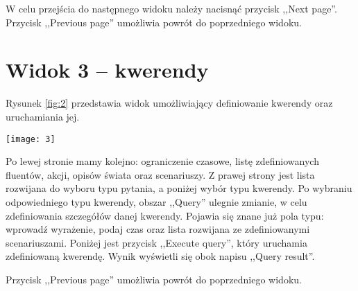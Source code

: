 \documentclass{mini}
\begin{document}
W celu przejścia do następnego widoku należy nacisnąć przycisk ,,Next page''. Przycisk ,,Previous page'' umożliwia powrót do poprzedniego widoku. 

\chapter{Widok 3 -- kwerendy}

Rysunek \ref{fig:2} przedstawia widok umożliwiający definiowanie kwerendy oraz uruchamiania jej.

\begin{center}
  \texttt{[image: 3]}
   \label{fig:3}
\end{center}

Po lewej stronie mamy kolejno: ograniczenie czasowe, listę zdefiniowanych fluentów, akcji, opisów świata oraz scenariuszy.
Z prawej strony jest lista rozwijana do wyboru typu pytania, a poniżej wybór typu kwerendy. Po wybraniu odpowiedniego typu kwerendy, obszar ,,Query'' ulegnie zmianie, w celu zdefiniowania szczegółów danej kwerendy. Pojawia się znane już pola typu: wprowadź wyrażenie, podaj czas oraz lista rozwijana ze zdefiniowanymi scenariuszami.
Poniżej jest przycisk ,,Execute query'', który uruchamia zdefiniowaną kwerendę. Wynik wyświetli się obok napisu ,,Query result''.

Przycisk ,,Previous page'' umożliwia powrót do poprzedniego widoku.
\end{document}
